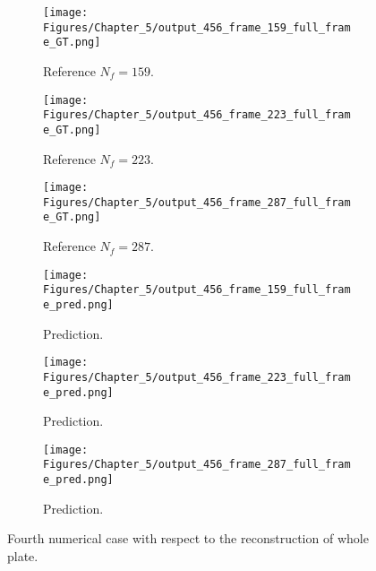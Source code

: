 \begin{figure} [!ht]
	\centering
	\begin{subfigure}[b]{.32\textwidth}
		\centering
		\texttt{[image: Figures/Chapter\_5/output\_456\_frame\_159\_full\_frame\_GT.png]}
		\caption{Reference $N_f=159$.}
		\label{fig:ref_456_full_159}
	\end{subfigure}
	\begin{subfigure}[b]{.32\textwidth}
		\centering
		\texttt{[image: Figures/Chapter\_5/output\_456\_frame\_223\_full\_frame\_GT.png]}
		\caption{Reference $N_f=223$.}
		\label{fig:ref_456_full_223}
	\end{subfigure}
	\begin{subfigure}[b]{.32\textwidth}
		\centering
		\texttt{[image: Figures/Chapter\_5/output\_456\_frame\_287\_full\_frame\_GT.png]}
		\caption{Reference $N_f=287$.}
		\label{fig:ref_456_full_287}	
	\end{subfigure}
	\begin{subfigure}[b]{.32\textwidth}
		\centering
		\texttt{[image: Figures/Chapter\_5/output\_456\_frame\_159\_full\_frame\_pred.png]}
		\caption{Prediction.}
		\label{fig:pred_456_full_159}
	\end{subfigure}
	\begin{subfigure}[b]{.32\textwidth}
		\centering
		\texttt{[image: Figures/Chapter\_5/output\_456\_frame\_223\_full\_frame\_pred.png]}
		\caption{Prediction.}
		\label{fig:pred_456_full_223}
	\end{subfigure}
	\begin{subfigure}[b]{.32\textwidth}
		\centering
		\texttt{[image: Figures/Chapter\_5/output\_456\_frame\_287\_full\_frame\_pred.png]}
		\caption{Prediction.}
		\label{fig:pred_456_full_287}	
	\end{subfigure}
	\caption{Fourth numerical case with respect to the reconstruction of whole plate.}
	\label{fig:num_results_CS_456}
\end{figure}

